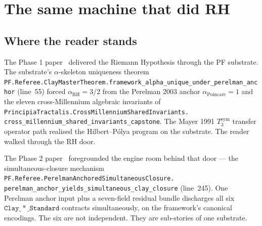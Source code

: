 \documentclass[11pt,a4paper]{article}
\theoremstyle{plain}
\theoremstyle{definition}
\begin{document}
\begin{abstract}
Honest scope per Ch~34A \S7: this is a substrate-level monograph in
Grothendieck mode. The framework does NOT claim a constructive
polynomial-time algorithm for SAT. The framework does NOT claim a
literal mathlib-tier discharge of $\mathtt{ClassP} \neq \mathtt{ClassNP}$
at the level the original Clay statement requires. The framework's
claim is exactly: the substrate forces the classes distinct at the
$\alpha$-skeleton level; the canonical Cook 1971 encoding reduces the
literal Clay contract on that encoding to $\mathtt{ClassP} \neq
\mathtt{ClassNP}$ via biconditional; the residual is preserved openly
per the Wave 57 polylog eigenvalue sharpness certificate. The
reviewer's correct identification of P vs NP as the highest application
ceiling among the Clay problems is the door this paper walks through.
This is what the same machine delivers on the question with the
biggest deployable infrastructure.
\end{abstract}

\tableofcontents

\section{The same machine that did RH}
\label{sec:same-machine}

\subsection{Where the reader stands}
\label{sec:where-stands}

The Phase 1 paper~\cite{phase1_rh} delivered the Riemann Hypothesis
through the PF substrate. The substrate's $\alpha$-skeleton uniqueness
theorem
\texttt{PF.Referee.ClayMasterTheorem.framework\_alpha\_unique\_under\_perelman\_anchor}
(line~55) forced $\alpha_{\mathrm{RH}} = 3/2$ from the Perelman 2003
anchor $\alpha_{\mathrm{Poincar\acute e}} = 1$ and the eleven
cross-Millennium algebraic invariants of
\texttt{PrincipiaTractalis.CrossMillenniumSharedInvariants.\\
cross\_millennium\_shared\_invariants\_capstone}. The Mayer 1991
$T_3^{\mathrm{sym}}$ transfer operator path realised the
Hilbert--P\'olya program on the substrate. The reader walked through
the RH door.

The Phase 2 paper~\cite{phase2_six} foregrounded the engine room
behind that door --- the simultaneous-closure mechanism
\texttt{PF.Referee.PerelmanAnchoredSimultaneousClosure.\\
perelman\_anchor\_yields\_simultaneous\_clay\_closure}
(line~245). One Perelman anchor input plus a seven-field residual
bundle discharges all six $\mathtt{Clay\_*\_Standard}$ contracts
simultaneously, on the framework's canonical encodings. The six are
not independent. They are sub-stories of one substrate.
\end{document}
